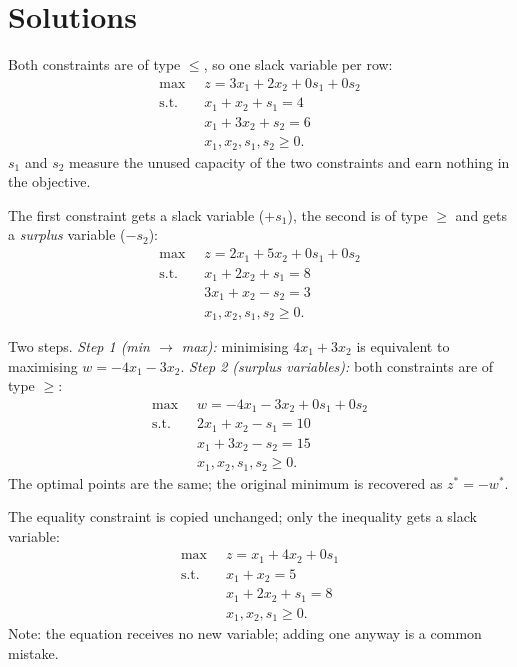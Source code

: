 \section{Solutions}

\begin{solutions}
  \item Both constraints are of type $\le$, so one slack variable per row:
        \[
          \begin{aligned}
            \max\;\; & z=3x_{1}+2x_{2}+0s_{1}+0s_{2}\\
            \text{s.t.}\;\; & x_{1}+x_{2}+s_{1}=4\\
            & x_{1}+3x_{2}+s_{2}=6\\
            & x_{1},x_{2},s_{1},s_{2}\ge 0 .
          \end{aligned}
        \]
        $s_{1}$ and $s_{2}$ measure the unused capacity of the two
        constraints and earn nothing in the objective.

  \item The first constraint gets a slack variable ($+s_{1}$), the second
        is of type $\ge$ and gets a \emph{surplus} variable ($-s_{2}$):
        \[
          \begin{aligned}
            \max\;\; & z=2x_{1}+5x_{2}+0s_{1}+0s_{2}\\
            \text{s.t.}\;\; & x_{1}+2x_{2}+s_{1}=8\\
            & 3x_{1}+x_{2}-s_{2}=3\\
            & x_{1},x_{2},s_{1},s_{2}\ge 0 .
          \end{aligned}
        \]

  \item Two steps. \emph{Step 1 (min $\to$ max):} minimising
        $4x_{1}+3x_{2}$ is equivalent to maximising
        $w=-4x_{1}-3x_{2}$. \emph{Step 2 (surplus variables):} both
        constraints are of type $\ge$:
        \[
          \begin{aligned}
            \max\;\; & w=-4x_{1}-3x_{2}+0s_{1}+0s_{2}\\
            \text{s.t.}\;\; & 2x_{1}+x_{2}-s_{1}=10\\
            & x_{1}+3x_{2}-s_{2}=15\\
            & x_{1},x_{2},s_{1},s_{2}\ge 0 .
          \end{aligned}
        \]
        The optimal points are the same; the original minimum is recovered
        as $z^{*}=-w^{*}$.

  \item The equality constraint is copied unchanged; only the inequality
        gets a slack variable:
        \[
          \begin{aligned}
            \max\;\; & z=x_{1}+4x_{2}+0s_{1}\\
            \text{s.t.}\;\; & x_{1}+x_{2}=5\\
            & x_{1}+2x_{2}+s_{1}=8\\
            & x_{1},x_{2},s_{1}\ge 0 .
          \end{aligned}
        \]
        Note: the equation receives no new variable; adding one anyway is
        a common mistake.


\end{solutions}
